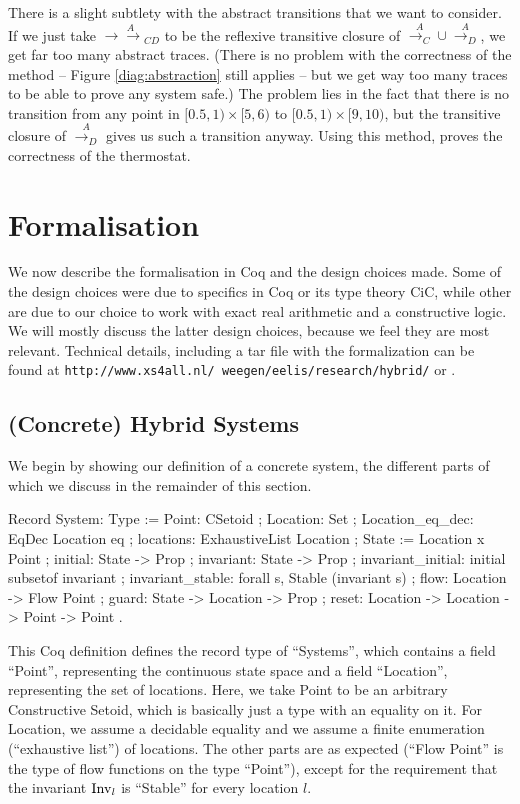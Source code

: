 \documentclass[runningheads]{llncs}
\newcommand{\ADAM}[1] {\todo{\textsc{Adam says}: #1}}
\newcommand{\Inv}{{\rm Inv}}
\newcommand{\doubleheadrightarrow}{\mathrel{\rightarrow\!\!\!\!\rightarrow}}
\newcommand{\attrans}{\stackrel{A}{\doubleheadrightarrow_{CD}}}
\newcommand{\acontrans}{\stackrel{A}{\rightarrow_C}}
\newcommand{\adistrans}{\stackrel{A}{\rightarrow_D}}
\begin{document}
There is a slight subtlety with the abstract transitions that we want
to consider. If we just take $\attrans$ to be the reflexive transitive
closure of $\acontrans \cup \adistrans$, we get far too many abstract
traces. (There is no problem with the correctness of the method --
Figure \ref{diag:abstraction} still applies -- but we get way too many
traces to be able to prove any system safe.) The problem lies in the
fact that there is no transition from any point in $[0.5,1)
  \times[5,6)$ to $[0.5,1) \times[9,10)$, but the transitive closure
        of $\adistrans$ gives us such a transition anyway. 
Using this method, \cite{alur} proves the correctness of the thermostat. 

\section{Formalisation}
We now describe the formalisation in Coq and the design choices
made. Some of the design choices were due to specifics in Coq or its
type theory CiC, while other are due to our choice to work with exact
real arithmetic and a constructive logic. We will mostly discuss the
latter design choices, because we feel they are most relevant. Technical details, including a tar file with the formalization can be found at {\tt http://www.xs4all.nl/~weegen/eelis/research/hybrid/} or \cite{hybrid-techreport}.

\subsection{(Concrete) Hybrid Systems}
\label{concrete}

We begin by showing our definition of a concrete system, the different
parts of which we discuss in the remainder of this section.

\begin{code}
Record System: Type :=
  { Point: CSetoid
  ; Location: Set
  ; Location_eq_dec: EqDec Location eq
  ; locations: ExhaustiveList Location
  ; State :=  Location x Point
  ; initial: State -> Prop
  ; invariant: State -> Prop
  ; invariant_initial: initial subsetof invariant
  ; invariant_stable: forall s, Stable (invariant s)
  ; flow: Location -> Flow Point
  ; guard: State -> Location -> Prop
  ; reset: Location -> Location -> Point -> Point  }.
\end{code}

This Coq definition defines the record type of ``Systems'', which
contains a field ``Point'', representing the continuous state space
and a field ``Location'', representing the set of locations. Here, we
take Point to be an arbitrary Constructive Setoid, which is basically
just a type with an equality on it. For Location, we assume a
decidable equality and we assume a finite enumeration (``exhaustive
list'') of locations. The other parts are as expected (``Flow Point''
is the type of flow functions on the type ``Point''), except for the
requirement that the invariant $\Inv_l$ is ``Stable'' for every
location $l$.
\end{document}
